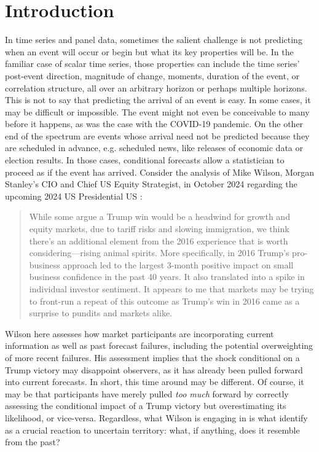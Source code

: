 \documentclass{uiucthesis2021}
\theoremstyle{definition}
\begin{document}
\section{Introduction}\label{Introduction}

In time series and panel data, sometimes the salient challenge is not predicting when an event will occur or begin but what its key properties will be.  In the familiar case of scalar time series, those properties can include the time series' post-event direction, magnitude of change, moments, duration of the event, or correlation structure, all over an arbitrary horizon or perhaps multiple horizons. This is not to say that predicting the arrival of an event is easy. In some cases, it may be difficult or impossible.  The event might not even be conceivable to many before it happens, as was the case with the COVID-19 pandemic.  On the other end of the spectrum are events whose arrival need not be predicted because they are scheduled in advance, e.g. scheduled news, like releases of economic data or election results.  In those cases, conditional forecasts allow a statistician to proceed as if the event has arrived.  Consider the analysis of Mike Wilson, Morgan Stanley’s CIO and Chief US Equity  Strategist, in October 2024 regarding the upcoming 2024 US Presidential US \citep{thoughts_on_market}:

\begin{quote}While some argue a Trump win would be a headwind for growth and equity markets, due to tariff  risks and slowing immigration, we think there's an additional element from the 2016 experience that  is worth considering—rising animal spirits. More specifically, in 2016 Trump's pro-business approach  led to the largest 3-month positive impact on small business confidence in the past 40 years. It also translated into a spike in individual investor sentiment. It appears to me that markets may be trying  to front-run a repeat of this outcome as Trump's win in 2016 came as a surprise to pundits and  markets alike.
\end{quote}
Wilson here assesses how market participants are incorporating current information as well as past forecast failures, including the potential overweighting of more recent failures.  His assessment implies that the shock conditional on a Trump victory may disappoint observers, as it has already been pulled forward into current forecasts.  In short, this time around may be different.  Of course, it may be that participants have merely pulled \textit{too much} forward by correctly assessing the conditional impact of a Trump victory but overestimating its likelihood, or vice-versa.  Regardless, what Wilson is engaging in is what \cite{lundquist2024volatility} identify as a crucial reaction to uncertain territory: what, if anything, does it resemble from the past?
\end{document}
